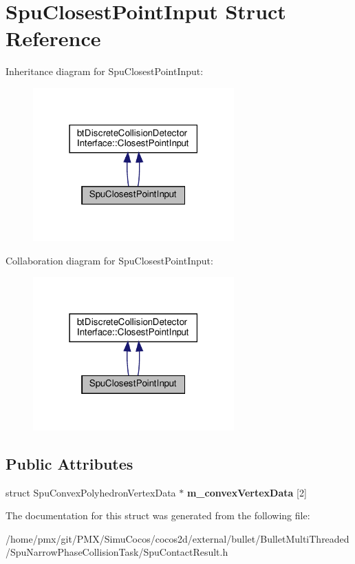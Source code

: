 \hypertarget{structSpuClosestPointInput}{}\section{Spu\+Closest\+Point\+Input Struct Reference}
\label{structSpuClosestPointInput}


Inheritance diagram for Spu\+Closest\+Point\+Input\+:
\nopagebreak
\begin{figure}[H]
\begin{center}
\leavevmode
\includegraphics[width=219pt]{structSpuClosestPointInput__inherit__graph}
\end{center}
\end{figure}


Collaboration diagram for Spu\+Closest\+Point\+Input\+:
\nopagebreak
\begin{figure}[H]
\begin{center}
\leavevmode
\includegraphics[width=219pt]{structSpuClosestPointInput__coll__graph}
\end{center}
\end{figure}
\subsection*{Public Attributes}
\begin{DoxyCompactItemize}
\item 
\mbox{\label{structSpuClosestPointInput_a097647cd6624f733a9c0f89bfa72bc18}} 
struct Spu\+Convex\+Polyhedron\+Vertex\+Data $\ast$ {\bfseries m\+\_\+convex\+Vertex\+Data} \mbox{[}2\mbox{]}
\end{DoxyCompactItemize}


The documentation for this struct was generated from the following file\+:\begin{DoxyCompactItemize}
\item 
/home/pmx/git/\+P\+M\+X/\+Simu\+Cocos/cocos2d/external/bullet/\+Bullet\+Multi\+Threaded/\+Spu\+Narrow\+Phase\+Collision\+Task/Spu\+Contact\+Result.\+h\end{DoxyCompactItemize}
